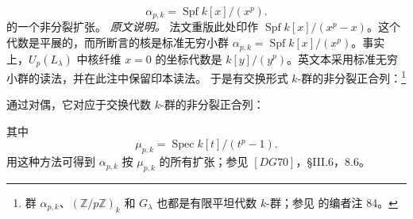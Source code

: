 \[
  \alpha_{p,k}=\operatorname{Spf}k[x]/(x^p).
\]
的一个非分裂扩张。
\label{sga3:VIIB:2.5.2.A:alpha-p-source-note}
\noindent\textit{原文说明。}\enspace
法文重版此处印作 \(\operatorname{Spf}k[x]/(x^p-x)\)。这个代数是平展的，而所断言的核是标准无穷小群 \(\alpha_{p,k}=\operatorname{Spf}k[x]/(x^p)\)。事实上，\(U_p(L_\lambda)\) 中核纤维 \(x=0\) 的坐标代数是 \(k[y]/(y^p)\)。英文本采用标准无穷小群的读法，并在此注中保留印本读法。
于是有交换形式 \(k\)-群的非分裂正合列：\footnote{%
\label{sga3:VIIB:nde:102}群 \(\alpha_{p,k}\)、\((\mathbb Z/p\mathbb Z)_k\) 和 \(G_\lambda\) 也都是有限平坦代数 \(k\)-群；参见  的编者注 84。}
\begin{center}
  \label{sga3:VIIB:2.5.2.A:nonsplit-formal-sequence}
  
\end{center}
通过对偶，它对应于交换代数 \(k\)-群的非分裂正合列：
\begin{center}
  \label{sga3:VIIB:2.5.2.A:nonsplit-dual-sequence}
  
\end{center}
其中
\[
  \mu_{p,k}=\operatorname{Spec}k[t]/(t^p-1).
\]
用这种方法可得到 \(\alpha_{p,k}\) 按 \(\mu_{p,k}\) 的所有扩张；参见 \([DG70]\)，§III.6，8.6。
